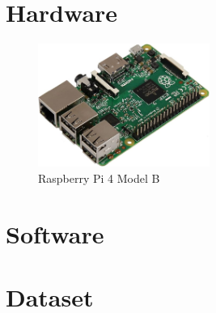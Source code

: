 \section{Hardware}
\lipsum[4-8]
\begin{figure}
\centering
\includegraphics[width=0.5\textwidth]{images/raspimg.jpg}
\caption{Raspberry Pi 4 Model B}

\end{figure}
\section{Software}
\lipsum[4-8]
\section{Dataset}
\lipsum[4-8]
